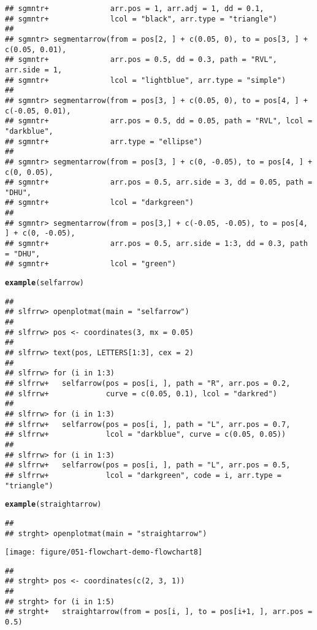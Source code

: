 \documentclass{article}\usepackage[]{graphicx}\usepackage[]{color}
\makeatletter
\def\maxwidth{ %
  \ifdim\Gin@nat@width>\linewidth
    \linewidth
  \else
    \Gin@nat@width
  \fi
}
\newcommand{\hlstd}[1]{\textcolor[rgb]{0.345,0.345,0.345}{#1}}%
\newcommand{\hlkwd}[1]{\textcolor[rgb]{0.737,0.353,0.396}{\textbf{#1}}}%
\newenvironment{kframe}{%
 \def\at@end@of@kframe{}%
 \ifinner\ifhmode%
  \def\at@end@of@kframe{\end{minipage}}%
  \begin{minipage}{\columnwidth}%
 \fi\fi%
 \def\FrameCommand##1{\hskip\@totalleftmargin \hskip-\fboxsep
 \colorbox{shadecolor}{##1}\hskip-\fboxsep
     \hskip-\linewidth \hskip-\@totalleftmargin \hskip\columnwidth}%
 \MakeFramed {\advance\hsize-\width
   \@totalleftmargin\z@ \linewidth\hsize
   \@setminipage}}%
 {\par\unskip\endMakeFramed%
 \at@end@of@kframe}
\newenvironment{knitrout}{}{} %
\makeatother
\begin{document}
\begin{knitrout}
\begin{kframe}
\begin{verbatim}
## sgmntr+              arr.pos = 1, arr.adj = 1, dd = 0.1,
## sgmntr+              lcol = "black", arr.type = "triangle")
## 
## sgmntr> segmentarrow(from = pos[2, ] + c(0.05, 0), to = pos[3, ] + c(0.05, 0.01),
## sgmntr+              arr.pos = 0.5, dd = 0.3, path = "RVL", arr.side = 1,
## sgmntr+              lcol = "lightblue", arr.type = "simple")  
## 
## sgmntr> segmentarrow(from = pos[3, ] + c(0.05, 0), to = pos[4, ] + c(-0.05, 0.01),
## sgmntr+              arr.pos = 0.5, dd = 0.05, path = "RVL", lcol = "darkblue",
## sgmntr+              arr.type = "ellipse")  
## 
## sgmntr> segmentarrow(from = pos[3, ] + c(0, -0.05), to = pos[4, ] + c(0, 0.05),
## sgmntr+              arr.pos = 0.5, arr.side = 3, dd = 0.05, path = "DHU",
## sgmntr+              lcol = "darkgreen")  
## 
## sgmntr> segmentarrow(from = pos[3,] + c(-0.05, -0.05), to = pos[4, ] + c(0, -0.05),
## sgmntr+              arr.pos = 0.5, arr.side = 1:3, dd = 0.3, path = "DHU",
## sgmntr+              lcol = "green")
\end{verbatim}
\begin{alltt}
\hlkwd{example}\hlstd{(selfarrow)}
\end{alltt}
\begin{verbatim}
## 
## slfrrw> openplotmat(main = "selfarrow")
## 
## slfrrw> pos <- coordinates(3, mx = 0.05)
## 
## slfrrw> text(pos, LETTERS[1:3], cex = 2)
## 
## slfrrw> for (i in 1:3) 
## slfrrw+   selfarrow(pos = pos[i, ], path = "R", arr.pos = 0.2,
## slfrrw+             curve = c(0.05, 0.1), lcol = "darkred")
## 
## slfrrw> for (i in 1:3) 
## slfrrw+   selfarrow(pos = pos[i, ], path = "L", arr.pos = 0.7,
## slfrrw+             lcol = "darkblue", curve = c(0.05, 0.05))
## 
## slfrrw> for (i in 1:3) 
## slfrrw+   selfarrow(pos = pos[i, ], path = "L", arr.pos = 0.5,
## slfrrw+             lcol = "darkgreen", code = i, arr.type = "triangle")
\end{verbatim}
\begin{alltt}
\hlkwd{example}\hlstd{(straightarrow)}
\end{alltt}
\begin{verbatim}
## 
## strght> openplotmat(main = "straightarrow")
\end{verbatim}
\end{kframe}
\texttt{[image: figure/051-flowchart-demo-flowchart8]} 
\begin{kframe}\begin{verbatim}
## 
## strght> pos <- coordinates(c(2, 3, 1))
## 
## strght> for (i in 1:5) 
## strght+   straightarrow(from = pos[i, ], to = pos[i+1, ], arr.pos = 0.5)

\end{verbatim}
\end{kframe}
\end{knitrout}
\end{document}
